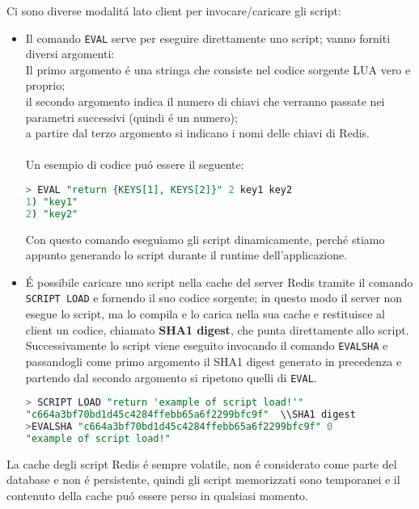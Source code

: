 Ci sono diverse modalitá lato client per invocare/caricare gli script:
\begin{itemize}
    \item Il comando \texttt{EVAL} serve per eseguire direttamente uno script; vanno forniti diversi argomenti:\\
    Il primo argomento é una stringa che consiste nel codice sorgente LUA vero e proprio;\\
    il secondo argomento indica il numero di chiavi che verranno passate nei parametri successivi (quindi é un numero);\\
    a partire dal terzo argomento si indicano i nomi delle chiavi di Redis.\\
      \\


    Un esempio di codice puó essere il seguente:
    \begin{lstlisting}[autogobble, style=redis-cli, language=SQL]
> EVAL "return {KEYS[1], KEYS[2]}" 2 key1 key2
1) "key1"
2) "key2"\end{lstlisting}
    Con questo comando eseguiamo gli script dinamicamente, perché stiamo appunto generando lo script durante il runtime dell'applicazione.
    \item É possibile caricare uno script nella cache del server Redis tramite il comando \texttt{SCRIPT LOAD} e fornendo il suo codice
    sorgente; in questo modo il server non esegue lo script, ma lo compila e lo carica nella sua cache e restituisce al client un codice, chiamato
    \textbf{SHA1 digest}, che punta direttamente allo script. Successivamente lo script viene eseguito invocando il comando \texttt{EVALSHA} e passandogli come
    primo argomento il SHA1 digest generato in precedenza e partendo dal secondo argomento si ripetono quelli di \texttt{EVAL}.

    \begin{lstlisting}[autogobble, style=redis-cli, language=SQL]
> SCRIPT LOAD "return 'example of script load!'"
"c664a3bf70bd1d45c4284ffebb65a6f2299bfc9f"  \\SHA1 digest
>EVALSHA "c664a3bf70bd1d45c4284ffebb65a6f2299bfc9f" 0
"example of script load!"\end{lstlisting}
\end{itemize}

La cache degli script Redis é sempre volatile, non é considerato come parte del database e non é persistente, quindi gli script memorizzati
sono temporanei e il contenuto della cache puó essere perso in qualsiasi momento.